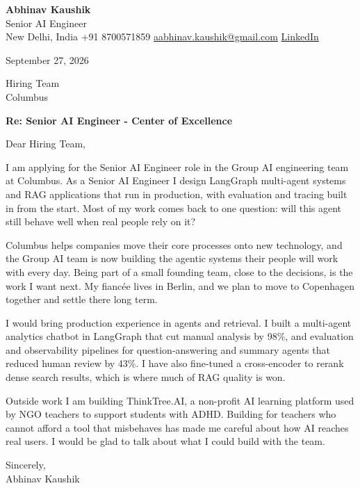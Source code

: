 \documentclass[11pt,a4paper]{article}
\begin{document}
{\Large\bfseries Abhinav Kaushik}\\
Senior AI Engineer\\
New Delhi, India \textbar{} +91 8700571859 \textbar{} \href{mailto:aabhinav.kaushik@gmail.com}{aabhinav.kaushik@gmail.com} \textbar{} \href{https://www.linkedin.com/in/abhinav-kaushik10/}{LinkedIn}  

September 27, 2026

Hiring Team\\
Columbus

\textbf{Re: Senior AI Engineer - Center of Excellence}

Dear Hiring Team,

I am applying for the Senior AI Engineer role in the Group AI engineering team at Columbus. As a Senior AI Engineer I design LangGraph multi-agent systems and RAG applications that run in production, with evaluation and tracing built in from the start. Most of my work comes back to one question: will this agent still behave well when real people rely on it?

Columbus helps companies move their core processes onto new technology, and the Group AI team is now building the agentic systems their people will work with every day. Being part of a small founding team, close to the decisions, is the work I want next. My fiancée lives in Berlin, and we plan to move to Copenhagen together and settle there long term.

I would bring production experience in agents and retrieval. I built a multi-agent analytics chatbot in LangGraph that cut manual analysis by 98\%, and evaluation and observability pipelines for question-answering and summary agents that reduced human review by 43\%. I have also fine-tuned a cross-encoder to rerank dense search results, which is where much of RAG quality is won.

Outside work I am building ThinkTree.AI, a non-profit AI learning platform used by NGO teachers to support students with ADHD. Building for teachers who cannot afford a tool that misbehaves has made me careful about how AI reaches real users. I would be glad to talk about what I could build with the team.

Sincerely,\\[4pt]
Abhinav Kaushik
\end{document}
